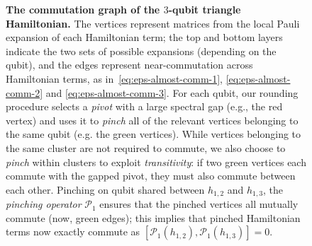 \documentclass[a4paper,onecolumn,11pt]{quantumarticle}
\theoremstyle{plain}
\renewcommand{\C}{\mathbb{C}}
\begin{document}
\begin{figure}[t]

    \caption{\textbf{The commutation graph of the $3$-qubit triangle Hamiltonian.} 
    The vertices represent matrices from the local Pauli expansion of each Hamiltonian term;
the top and bottom layers indicate the two sets of possible expansions 
(depending on the qubit), and the edges represent near-commutation 
across Hamiltonian terms, as in~\eqref{eq:eps-almost-comm-1}, 
\eqref{eq:eps-almost-comm-2} and \eqref{eq:eps-almost-comm-3}. For each 
qubit, our rounding procedure selects a \emph{pivot} with a large 
spectral gap (e.g., the red vertex) and uses it to \emph{pinch} all of 
the relevant vertices belonging to the same qubit (e.g. the green 
vertices). While vertices belonging to the same cluster are not 
required to 
commute, we also choose to \emph{pinch} within clusters to exploit 
\emph{transitivity}: if two green vertices each commute with the gapped 
pivot, they must also commute between each other. Pinching on qubit 
shared between $h_{1,2}$ and $h_{1,3}$, the \emph{pinching operator} 
$\mathcal{P}_1$ ensures that the pinched vertices all mutually commute 
(now, green edges); this implies that 
 pinched Hamiltonian terms now exactly commute as $[\mathcal{P}_1(h_{1,2}),\mathcal{P}_1(h_{1,3})]=0$.
 }\label{fig:triangle-Hamiltinonian-rounding}
\end{figure}
\end{document}
